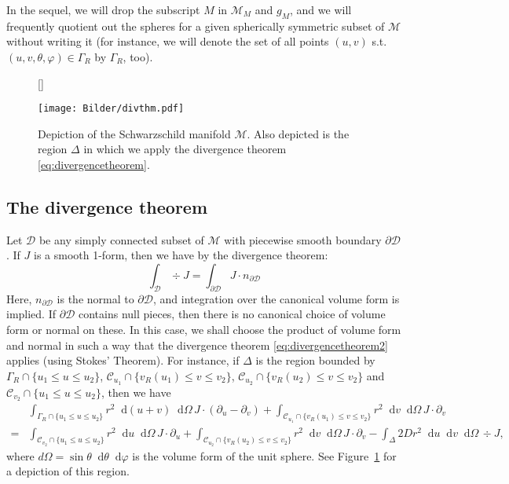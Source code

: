 \documentclass[11pt,english]{article}
\numberwithin{equation}{section}
\theoremstyle{remark}
\theoremstyle{plain}
\theoremstyle{remark}
\newcommand{\dd}{\mathop{}\!\mathrm{d}}
\newcommand{\pu}{\partial_u}
\newcommand{\pv}{\partial_v}
\renewcommand{\(}{\left(}
\renewcommand{\)}{\right)}
\begin{document}
In the sequel, we will drop the subscript $M$ in $\mathcal{M}_M$ and $g_M$, and we will frequently quotient out the spheres for a given spherically symmetric subset of $\mathcal M$ without writing it (for instance, we will denote the set of all points $(u,v)$ s.t.\ $(u,v,\theta,\varphi)\in \Gamma_R$ by $\Gamma_R$, too).
\begin{figure}[htbp]
[\FBwidth]
{\caption{Depiction of the Schwarzschild manifold $\mathcal M$. Also depicted is the region $\Delta$ in which we apply the divergence theorem \eqref{eq:divergencetheorem}.}
\label{fig:III:4}}
{\texttt{[image: Bilder/divthm.pdf]}}
\end{figure}
\subsection{The divergence theorem}
Let $\mathcal{D}$ be any simply connected subset of $\mathcal{M}$ with piecewise smooth boundary $\partial\mathcal{D}$. If $J$ is a smooth 1-form, then we have by the divergence theorem:
\begin{equation}\label{eq:divergencetheorem2}
\int_{\mathcal{D}}\div J=\int_{\partial\mathcal{D}}J\cdot n_{\partial\mathcal{D}}
\end{equation}
Here, $n_{\partial\mathcal{D}}$ is the normal to $\partial\mathcal{D}$, and integration over the canonical volume form is implied. If $\partial\mathcal{D}$ contains null pieces, then there is no canonical choice of volume form or normal on these. In this case, we shall choose the product of volume form and normal in such a way that the divergence theorem \eqref{eq:divergencetheorem2} applies (using Stokes' Theorem). %
For instance, if $\Delta$ is the region bounded by $\Gamma_R\cap\{u_1\leq u\leq u_2\}$, $\mathcal{C}_{u_1}\cap\{v_R(u_1)\leq v\leq v_2\}$, $\mathcal{C}_{u_2}\cap\{v_R(u_2)\leq v\leq v_2\}$ and $\mathcal{C}_{v_2}\cap\{u_1\leq u\leq u_2\}$, then we have
\begin{align}\label{eq:divergencetheorem}
&\int_{\Gamma_R\cap\{u_1\leq u\leq u_2\}}  r^2\dd (u+v)\dd \Omega	\,J\cdot(\pu-\pv)
+\int_{\mathcal{C}_{u_1}\cap\{v_R(u_1)\leq v\leq v_2\}} r^2 \dd v \dd \Omega \,J\cdot \pv \nonumber\\
=&\int_{\mathcal{C}_{v_2}\cap\{u_1\leq u\leq u_2\}} r^2\dd u \dd \Omega\, J\cdot \pu 
+\int_{\mathcal{C}_{u_2}\cap\{v_R(u_2)\leq v\leq v_2\}} r^2 \dd v \dd \Omega \,J\cdot \pv
-\int_{\Delta} 2Dr^2 \dd u\dd v\dd \Omega\, \div J ,
\end{align}
where $d\Omega=\sin\theta \dd \theta \dd \varphi$ is the volume form of the unit sphere. 
See Figure~\ref{fig:III:4} for a depiction of this region.
\end{document}

